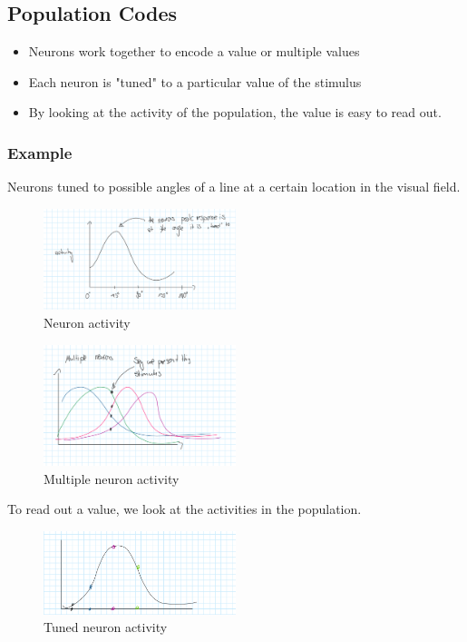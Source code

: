 \documentclass{article}
\begin{document}
\subsection{Population Codes}

\begin{itemize}
    \item Neurons work together to encode a value or multiple values
    \item Each neuron is "tuned" to a particular value of the stimulus
    \item By looking at the activity of the population, the value is easy to read out.
\end{itemize}

\subsubsection{Example}



Neurons tuned to possible angles of a line at a certain location in the visual field.

\begin{figure}[H]
\centering
\includegraphics[width=0.5\textwidth]{assets/activity.png}
\caption{Neuron activity}
\end{figure}

\begin{figure}[H]
\centering
\includegraphics[width=0.5\textwidth]{assets/multipleActivity.png}
\caption{Multiple neuron activity}
\end{figure}

To read out a value, we look at the activities in the population.

\begin{figure}[H]
\centering
\includegraphics[width=0.5\textwidth]{assets/tunedActivity.png}
\caption{Tuned neuron activity}
\end{figure}
\end{document}
